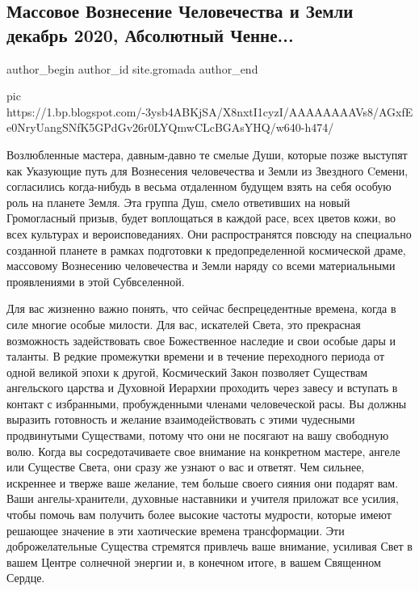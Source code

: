  
 
 
 
 
 
\subsection{Массовое Вознесение Человечества и Земли декабрь 2020, Абсолютный Ченне...}
\label{sec:04_12_2020..site.gromada.1.massovoje_voznesenije}
\ifcmt
	author_begin
   author_id site.gromada
	author_end
\fi

\ifcmt
pic https://1.bp.blogspot.com/-3ysb4ABKjSA/X8nxtI1cyzI/AAAAAAAAVs8/AGxfEe0NryUangSNfK5GPdGv26r0LYQmwCLcBGAsYHQ/w640-h474/%
\fi

Возлюбленные мастера, давным-давно те смелые Души, которые позже выступят как
Указующие путь для Вознесения человечества и Земли из Звездного Cемени,
согласились когда-нибудь в весьма отдаленном будущем взять на себя особую роль
на планете Земля. Эта группа Душ, смело ответивших на новый Громогласный
призыв, будет воплощаться в каждой расе, всех цветов кожи, во всех культурах и
вероисповеданиях. Они распространятся повсюду на специально созданной планете в
рамках подготовки к предопределенной космической драме, массовому Вознесению
человечества и Земли наряду со всеми материальными проявлениями в этой
Субвселенной.


Для вас жизненно важно понять, что сейчас беспрецедентные времена, когда в силе
многие особые милости. Для вас, искателей Света, это прекрасная возможность
задействовать свое Божественное наследие и свои особые дары и таланты.  В
редкие промежутки времени и в течение переходного периода от одной великой
эпохи к другой, Космический Закон позволяет Существам ангельского царства и
Духовной Иерархии проходить через завесу и вступать в контакт с избранными,
пробужденными членами человеческой расы.  Вы должны выразить готовность и
желание взаимодействовать с этими чудесными продвинутыми Существами, потому что
они не посягают на вашу свободную волю.  Когда вы сосредотачиваете свое
внимание на конкретном мастере, ангеле или Существе Света, они сразу же узнают
о вас и ответят. Чем сильнее, искреннее и тверже ваше желание, тем больше
своего сияния они подарят вам. Ваши ангелы-хранители, духовные наставники и
учителя приложат все усилия, чтобы помочь вам получить более высокие частоты
мудрости, которые имеют решающее значение в эти хаотические времена
трансформации. Эти доброжелательные Существа стремятся привлечь ваше внимание,
усиливая Свет в вашем Центре солнечной энергии и, в конечном итоге, в вашем
Священном Сердце.

